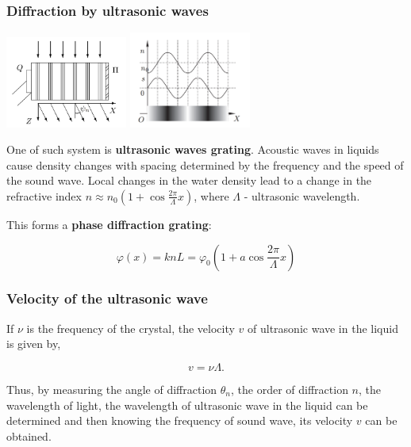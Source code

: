\documentclass{beamer}
\begin{document}
	\begin{frame}
		\frametitle{Diffraction by ultrasonic waves}
		\includegraphics[width=4cm]{res/acoustic_grating.png}
		\includegraphics[width=4cm]{res/n_x.png}
		
		One of such system is \textbf{ultrasonic waves grating}. 
		Acoustic waves in liquids cause density changes with spacing determined by the
		frequency and the speed of the sound wave.
		Local changes in the water density lead to a change in the refractive index $n \approx n_0 (1 + \cos{\frac{2\pi}{\Lambda}x})$, where $\Lambda$ - ultrasonic wavelength.
		
		This forms a \textbf{phase diffraction grating}:
		
		$$\varphi(x) = knL = \varphi_0 (1 + a \cos{\frac{2\pi}{\Lambda}x})$$
	\end{frame}

	
\begin{frame}
	\frametitle{Velocity of the ultrasonic wave}
	
	If $\nu$ is the frequency of the crystal, the velocity $v$ of ultrasonic wave in the
	liquid is given by, 
	
	$$v = \nu \Lambda.$$
	
	Thus, by measuring the angle of diffraction $\theta_n$, the order of diffraction $n$, the
	wavelength of light, the wavelength of ultrasonic wave in the liquid can be determined
	and then knowing the frequency of sound wave, its velocity $v$ can be obtained. 
\end{frame}
\end{document}
